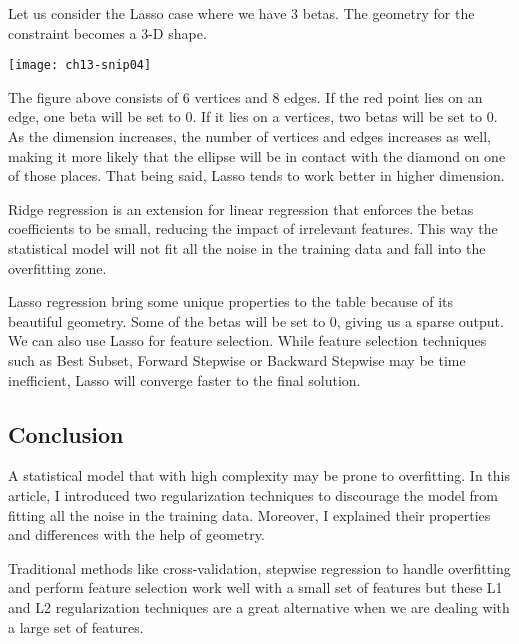 
Let us consider the Lasso case where we have 3 betas. The geometry for the constraint becomes a 3-D shape.
\begin{marginfigure}
\texttt{[image: ch13-snip04]}
\end{marginfigure}

The figure above consists of 6 vertices and 8 edges. If the red point lies on an edge, one beta will be set to 0. If it lies on a vertices, two betas will be set to 0. As the dimension increases, the number of vertices and edges increases as well, making it more likely that the ellipse will be in contact with the diamond on one of those places. That being said, Lasso tends to work better in higher dimension.


Ridge regression is an extension for linear regression that enforces the betas coefficients to be small, reducing the impact of irrelevant features. This way the statistical model will not fit all the noise in the training data and fall into the overfitting zone.

Lasso regression bring some unique properties to the table because of its beautiful geometry. Some of the betas will be set to 0, giving us a sparse output. We can also use Lasso for feature selection. While feature selection techniques such as Best Subset, Forward Stepwise or Backward Stepwise may be time inefficient, Lasso will converge faster to the final solution.

\subsection{Conclusion}

A statistical model that with high complexity may be prone to overfitting. In this article, I introduced two regularization techniques to discourage the model from fitting all the noise in the training data. Moreover, I explained their properties and differences with the help of geometry.

Traditional methods like cross-validation, stepwise regression to handle overfitting and perform feature selection work well with a small set of features but these L1 and L2 regularization techniques are a great alternative when we are dealing with a large set of features.


